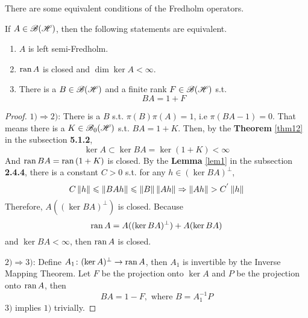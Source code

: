 There are some equivalent conditions of the Fredholm operators.
\begin{thm}
	If $A \in \mathscr{B(H)}$, then the following statements are equivalent.
	\begin{enumerate}[label = \arabic*)]
		\item $A$ is left semi-Fredholm.
		\item $\operatorname{ran}{A}$ is closed and $\dim{\ker{A}} < \infty$.
		\item There is a $B \in \mathscr{B(H)}$ and a finite rank $F \in \mathscr{B(H)}$ s.t.
		\begin{equation*}
			BA = 1 + F
		\end{equation*}
	\end{enumerate}
\end{thm}
\begin{proof}
	$1) \Rightarrow 2)$: There is a $B$ s.t. $\pi(B)\pi(A) = 1$, i.e $\pi(BA-1) = 0$. That means there is a $K \in \mathscr{B}_{0}\mathscr{(H)}$ s.t. $BA = 1 + K$. Then, by the \textbf{Theorem} \ref{thm12} in the subsection \textbf{5.1.2},
	\begin{equation*}
		\ker{A} \subset \ker{BA} = \ker{(1+K)} < \infty
	\end{equation*}
	And $\operatorname{ran}{BA} = \operatorname{ran}{(1+K)}$ is closed. By the \textbf{Lemma} \ref{lem1} in the subsection \textbf{2.4.4}, there is a constant $C > 0$ s.t. for any $h \in (\ker{BA})^{\bot}$, 
	\begin{equation*}
		C\left\lVert h\right\lVert \leqslant \left\lVert BAh\right\lVert \leqslant \left\lVert B\right\lVert\left\lVert Ah\right\lVert \Rightarrow \left\lVert Ah\right\lVert > C^{'}\left\lVert h\right\lVert
	\end{equation*}
	Therefore, $A((\ker{BA})^{\bot})$ is closed. Because
	\begin{equation*}
		\operatorname{ran}{A} = A((\ker{BA})^{\bot}) + A(\ker{BA})
	\end{equation*}
	and $\ker{BA} < \infty$, then $\operatorname{ran}{A}$ is closed.
	\item $2) \Rightarrow 3)$: Define $A_1 \colon (\ker{A})^{\bot} \rightarrow \operatorname{ran}{A}$, then $A_1$ is invertible by the Inverse Mapping Theorem. Let $F$ be the projection onto $\ker{A}$ and $P$ be the projection onto $\operatorname{ran}{A}$, then
	\begin{equation*}
		BA = 1 - F, \text{ where } B = A_1^{-1}P
	\end{equation*}
	$3)$ implies $1)$ trivially.
\end{proof}

